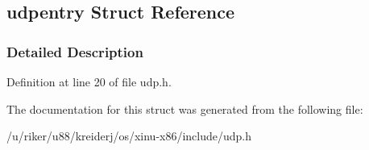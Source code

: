 \hypertarget{structudpentry}{}\subsection{udpentry Struct Reference}
\label{structudpentry}


\subsubsection{Detailed Description}


Definition at line 20 of file udp.\+h.



The documentation for this struct was generated from the following file\+:\begin{DoxyCompactItemize}
\item 
/u/riker/u88/kreiderj/os/xinu-\/x86/include/udp.\+h\end{DoxyCompactItemize}
